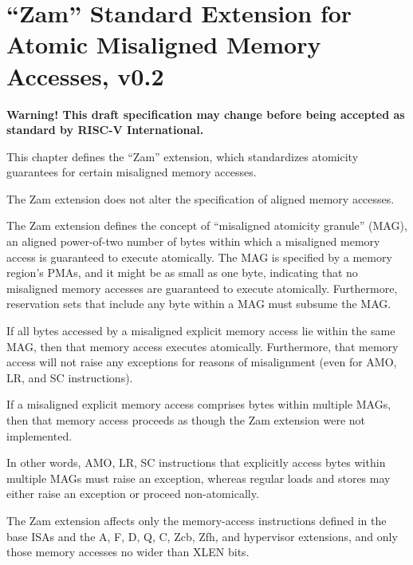 \chapter{``Zam'' Standard Extension for Atomic Misaligned Memory Accesses, v0.2}
\label{sec:zam}

{\bf Warning! This draft specification may change before being
accepted as standard by RISC-V International.}

This chapter defines the ``Zam'' extension, which standardizes atomicity
guarantees for certain misaligned memory accesses.

\begin{commentary}
The Zam extension does not alter the specification of aligned memory accesses.
\end{commentary}

The Zam extension defines the concept of ``misaligned atomicity granule''
(MAG), an aligned power-of-two number of bytes within which a misaligned
memory access is guaranteed to execute atomically.
The MAG is specified by a memory region's PMAs, and it might be as small as
one byte, indicating that no misaligned memory accesses are guaranteed to
execute atomically.
Furthermore, reservation sets that include any byte within a MAG must
subsume the MAG.

If all bytes accessed by a misaligned explicit memory access lie within the
same MAG, then that memory access executes atomically.
Furthermore, that memory access will not raise any exceptions for reasons
of misalignment (even for AMO, LR, and SC instructions).

If a misaligned explicit memory access comprises bytes within multiple MAGs,
then that memory access proceeds as though the Zam extension were not
implemented.

\begin{commentary}
In other words, AMO, LR, SC instructions that explicitly access bytes within
multiple MAGs must raise an exception, whereas regular loads and
stores may either raise an exception or proceed non-atomically.
\end{commentary}

The Zam extension affects only the memory-access instructions defined in the
base ISAs and the A, F, D, Q, C, Zcb, Zfh, and hypervisor extensions, and only
those memory accesses no wider than XLEN bits.
